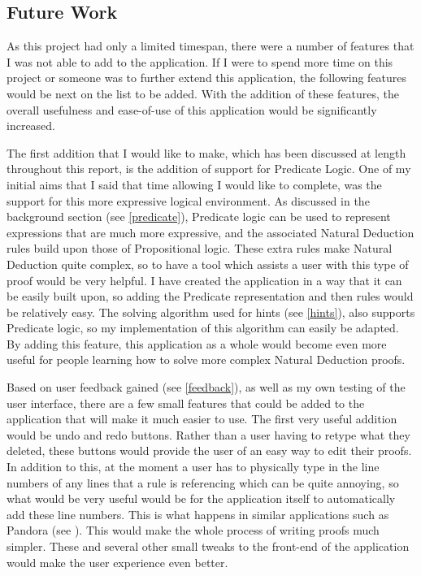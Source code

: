 \subsection{Future Work}

As this project had only a limited timespan, there were a number of features that I was not able to add to the application. If I were to spend more time on this project or someone was to further extend this application, the following features would be next on the list to be added. With the addition of these features, the overall usefulness and ease-of-use of this application would be significantly increased. 

The first addition that I would like to make, which has been discussed at length throughout this report, is the addition of support for Predicate Logic. One of my initial aims that I said that time allowing I would like to complete, was the support for this more expressive logical environment. As discussed in the background section (see \ref{predicate}), Predicate logic can be used to represent expressions that are much more expressive, and the associated Natural Deduction rules build upon those of Propositional logic. These extra rules make Natural Deduction quite complex, so to have a tool which assists a user with this type of proof would be very helpful. I have created the application in a way that it can be easily built upon, so adding the Predicate representation and then rules would be relatively easy. The solving algorithm used for hints (see \ref{hints}), also supports Predicate logic, so my implementation of this algorithm can easily be adapted. By adding this feature, this application as a whole would become even more useful for people learning how to solve more complex Natural Deduction proofs.

Based on user feedback gained (see \ref{feedback}), as well as my own testing of the user interface, there are a few small features that could be added to the application that will make it much easier to use. The first very useful addition would be undo and redo buttons. Rather than a user having to retype what they deleted, these buttons would provide the user of an easy way to edit their proofs. In addition to this, at the moment a user has to physically type in the line numbers of any lines that a rule is referencing which can be quite annoying, so what would be very useful would be for the application itself to automatically add these line numbers. This is what happens in similar applications such as Pandora (see \cite{pandora}). This would make the whole process of writing proofs much simpler. These and several other small tweaks to the front-end of the application would make the user experience even better.

